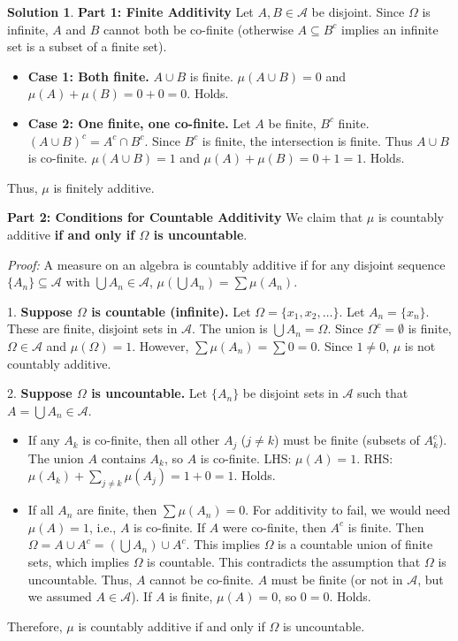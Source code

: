 \documentclass{article}
\theoremstyle{definition}
\newtheorem*{solution}{Solution}
\begin{document}
\begin{solution}
\textbf{Part 1: Finite Additivity}
Let $A, B \in \mathcal{A}$ be disjoint. Since $\Omega$ is infinite, $A$ and $B$ cannot both be co-finite (otherwise $A \subseteq B^c$ implies an infinite set is a subset of a finite set).
\begin{itemize}
    \item \textbf{Case 1: Both finite.} $A \cup B$ is finite.
    $\mu(A \cup B) = 0$ and $\mu(A) + \mu(B) = 0 + 0 = 0$. Holds.
    \item \textbf{Case 2: One finite, one co-finite.} Let $A$ be finite, $B^c$ finite.
    $(A \cup B)^c = A^c \cap B^c$. Since $B^c$ is finite, the intersection is finite. Thus $A \cup B$ is co-finite.
    $\mu(A \cup B) = 1$ and $\mu(A) + \mu(B) = 0 + 1 = 1$. Holds.
\end{itemize}
Thus, $\mu$ is finitely additive.

\textbf{Part 2: Conditions for Countable Additivity}
We claim that $\mu$ is countably additive \textbf{if and only if $\Omega$ is uncountable}.

\textit{Proof:}
A measure on an algebra is countably additive if for any disjoint sequence $\{A_n\} \subseteq \mathcal{A}$ with $\bigcup A_n \in \mathcal{A}$, $\mu(\bigcup A_n) = \sum \mu(A_n)$.

1. \textbf{Suppose $\Omega$ is countable (infinite).}
Let $\Omega = \{x_1, x_2, \dots\}$. Let $A_n = \{x_n\}$. These are finite, disjoint sets in $\mathcal{A}$.
The union is $\bigcup A_n = \Omega$. Since $\Omega^c = \emptyset$ is finite, $\Omega \in \mathcal{A}$ and $\mu(\Omega) = 1$.
However, $\sum \mu(A_n) = \sum 0 = 0$.
Since $1 \neq 0$, $\mu$ is not countably additive.

2. \textbf{Suppose $\Omega$ is uncountable.}
Let $\{A_n\}$ be disjoint sets in $\mathcal{A}$ such that $A = \bigcup A_n \in \mathcal{A}$.
\begin{itemize}
    \item If any $A_k$ is co-finite, then all other $A_j$ ($j \neq k$) must be finite (subsets of $A_k^c$). The union $A$ contains $A_k$, so $A$ is co-finite.
    LHS: $\mu(A) = 1$. RHS: $\mu(A_k) + \sum_{j \neq k} \mu(A_j) = 1 + 0 = 1$. Holds.
    \item If all $A_n$ are finite, then $\sum \mu(A_n) = 0$.
    For additivity to fail, we would need $\mu(A) = 1$, i.e., $A$ is co-finite.
    If $A$ were co-finite, then $A^c$ is finite.
    Then $\Omega = A \cup A^c = (\bigcup A_n) \cup A^c$.
    This implies $\Omega$ is a countable union of finite sets, which implies $\Omega$ is countable.
    This contradicts the assumption that $\Omega$ is uncountable.
    Thus, $A$ cannot be co-finite. $A$ must be finite (or not in $\mathcal{A}$, but we assumed $A \in \mathcal{A}$).
    If $A$ is finite, $\mu(A) = 0$, so $0=0$. Holds.
\end{itemize}
Therefore, $\mu$ is countably additive if and only if $\Omega$ is uncountable.
\end{solution}
\end{document}
